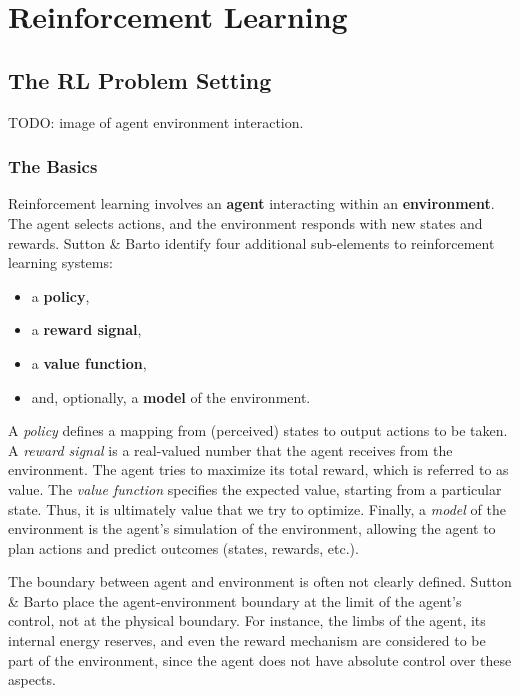 \chapter{Reinforcement Learning}
\label{chap: reinforcement learning}

\section{The RL Problem Setting}

TODO: image of agent environment interaction.

\subsection{The Basics}

Reinforcement learning involves an \textbf{agent} interacting within an \textbf{environment}. The agent selects actions, and the environment responds with new states and rewards. Sutton \& Barto \cite{sutton1998reinforcement} identify four additional sub-elements to reinforcement learning systems:
\begin{itemize}
	\item a \textbf{policy},
	\item a \textbf{reward signal},
	\item a \textbf{value function},
	\item and, optionally, a \textbf{model} of the environment.
\end{itemize}
\noindent A \textit{policy} defines a mapping from (perceived) states to output actions to be taken. A \textit{reward signal} is a real-valued number that the agent receives from the environment. The agent tries to maximize its total reward, which is referred to as value. The \textit{value function} specifies the expected value, starting from a particular state. Thus, it is ultimately value that we try to optimize. Finally, a \textit{model} of the environment is the agent's simulation of the environment, allowing the agent to plan actions and predict outcomes (states, rewards, etc.).

The boundary between agent and environment is often not clearly defined. Sutton \& Barto place the agent-environment boundary at the limit of the agent's control, not at the physical boundary. For instance, the limbs of the agent, its internal energy reserves, and even the reward mechanism are considered to be part of the environment, since the agent does not have absolute control over these aspects.

